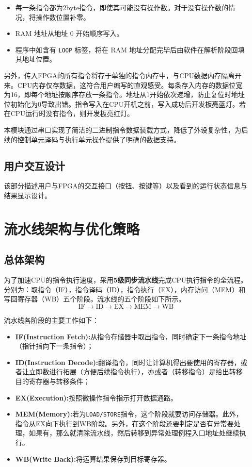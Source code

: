 \documentclass[lang=cn,a4paper,newtx]{elegantpaper}
\begin{document}
\begin{itemize}
  \item 每一条指令都为2byte指令，即使其可能没有操作数。对于没有操作数的情况，将操作数位置补零。
  \item RAM 地址从地址 0 开始顺序写入。
  \item 程序中如含有 \texttt{LOOP} 标签，将在 RAM 地址分配完毕后由软件在解析阶段回填其地址位置。
\end{itemize}

另外，传入FPGA的所有指令将存于单独的指令内存中，与CPU数据内存隔离开来。CPU内存仅存数据，这符合用户编写的直观感受。每条存入内存的数据位宽为16，即每个地址按顺序存放一条指令。地址从1开始依次递增，防止复位时地址位初始化为0导致出错。指令写入在CPU开机之前，写入成功后开发板亮蓝灯。若在CPU运行时没有指令，则开发板亮红灯。

本模块通过串口实现了简洁的二进制指令数据装载方式，降低了外设复杂性，为后续的控制单元译码与执行单元操作提供了明确的数据支持。

\subsection{用户交互设计}
该部分描述用户与FPGA的交互接口（按钮、按键等）以及看到的运行状态信息与结果显示设计。
\section{流水线架构与优化策略}
\subsection{总体架构}
为了加速CPU的指令执行速度，采用\textbf{5级同步流水线}完成CPU执行指令的全流程。分别为：取指令（IF），指令译码（ID），指令执行（EX），内存访问（MEM）和写回寄存器（WB）五个阶段。流水线的五个阶段如下所示。
$$
  \text{IF} \rightarrow \text{ID} \rightarrow \text{EX} \rightarrow \text{MEM} \rightarrow \text{WB}
$$

流水线各阶段的主要工作如下：
\begin{itemize}
  \item \textbf{IF(Instruction Fetch):}从指令存储器中取出指令，同时确定下一条指令地址（指针指向下一条指令）；
  \item \textbf{ID(Instruction Decode):}翻译指令，同时让计算机得出要使用的寄存器，或者让立即数进行拓展（方便后续指令执行），亦或者（转移指令）是给出转移目的寄存器与转移条件；
  \item \textbf{EX(Execution):}按照微操作指令指示打开数据通路。
  \item \textbf{MEM(Memory):}若为\texttt{LOAD/STORE}指令，这个阶段就要访问存储器。此外，指令从EX向下执行到WB阶段。另外，在这个阶段还要判定是否有异常要处理，如果有，那么就清除流水线，然后转移到异常处理例程入口地址处继续执行。
  \item \textbf{WB(Write Back):}将运算结果保存到目标寄存器。
\end{itemize}
\end{document}
